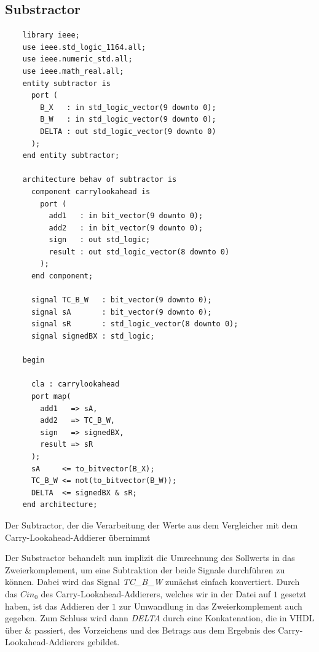 \documentclass{report}
\newenvironment{longlisting}{\captionsetup{type=listing}}{}
\begin{document}
\newpage
\subsection{Substractor}

\begin{longlisting}
  \centering
  \begin{verbatim}
    library ieee;
    use ieee.std_logic_1164.all;
    use ieee.numeric_std.all;
    use ieee.math_real.all;
    entity subtractor is
      port (
        B_X   : in std_logic_vector(9 downto 0);
        B_W   : in std_logic_vector(9 downto 0);
        DELTA : out std_logic_vector(9 downto 0)
      );
    end entity subtractor;
    
    architecture behav of subtractor is
      component carrylookahead is
        port (
          add1   : in bit_vector(9 downto 0);
          add2   : in bit_vector(9 downto 0);
          sign   : out std_logic;
          result : out std_logic_vector(8 downto 0)
        );
      end component;
    
      signal TC_B_W   : bit_vector(9 downto 0);
      signal sA       : bit_vector(9 downto 0);
      signal sR       : std_logic_vector(8 downto 0);
      signal signedBX : std_logic;
    
    begin
    
      cla : carrylookahead
      port map(
        add1   => sA,
        add2   => TC_B_W,
        sign   => signedBX,
        result => sR
      );
      sA     <= to_bitvector(B_X);
      TC_B_W <= not(to_bitvector(B_W));
      DELTA  <= signedBX & sR;
    end architecture;
  \end{verbatim}
  \caption{Der Subtractor, der die Verarbeitung der Werte aus dem Vergleicher mit dem Carry-Lookahead-Addierer übernimmt}
  \label{code:sub}
\end{longlisting}

\noindent
Der Substractor behandelt nun implizit die Umrechnung des Sollwerts in das Zweierkomplement, um eine Subtraktion der beide Signale durchführen zu können. Dabei wird das Signal \textit{TC\_B\_W} zunächst einfach konvertiert. Durch das $Cin_0$ des Carry-Lookahead-Addierers, welches wir in der Datei auf $1$ gesetzt haben, ist das Addieren der $1$ zur Umwandlung in das Zweierkomplement auch gegeben. Zum Schluss wird dann \textit{DELTA} durch eine Konkatenation, die in VHDL über \& passiert, des Vorzeichens und des Betrags aus dem Ergebnis des Carry-Lookahead-Addierers gebildet.\cite{DIG} 


\newpage
\end{document}
